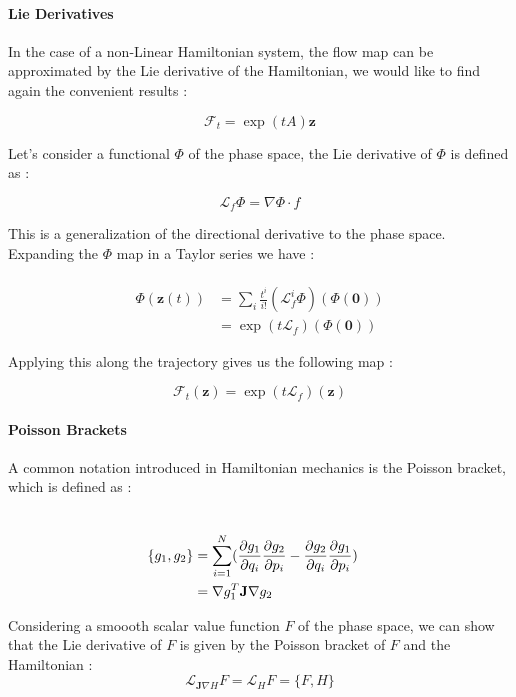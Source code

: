 \documentclass[ansiapaper]{report}
\begin{document}
\begin{multicols}{3}
	\paragraph*{Lie Derivatives}

	In the case of a non-Linear Hamiltonian system, the flow map can be approximated by the Lie derivative of the Hamiltonian, we would like to find again the convenient results :

	$$ \mathcal{F}_t = \exp(tA)\textbf{z}$$

	Let's consider a functional $\Phi$ of the phase space, the Lie derivative of $\Phi$ is defined as :

	$$ \mathcal{L}_f \Phi = \nabla \Phi \cdot f$$

	This is a generalization of the directional derivative to the phase space. Expanding the $\Phi$ map in a Taylor series we have :

	\begin{align*}
		\\ \Phi(\textbf{z}(t)) &= \sum_i \frac{t^i}{i!}(\mathcal{L}_f^i \Phi)( \Phi(\textbf{0} ))
		\\ &= \exp(t\mathcal{L}_f)(\Phi(\textbf{0}) )
	\end{align*}

	Applying this along the trajectory gives us the following map :

	$$\mathcal{F}_t(\textbf{z} ) = \exp(t\mathcal{L}_f)(\textbf{z})$$

	\paragraph*{Poisson Brackets}

	A common notation introduced in Hamiltonian mechanics is the Poisson bracket, which is defined as :

	\begin{align*}
		\\ \{g_1, g_2 \} &= \sum_{i = 1}^N (\pdv{g_1}{q_i}\pdv{g_2}{p_i} - \pdv{g_2}{q_i}\pdv{g_1}{p_i})
		\\ &= \nabla g_1^T \textbf{J} \nabla g_2
	\end{align*}

	Considering a smoooth scalar value function $F$ of the phase space, we can show that the Lie derivative of $F$ is given by the Poisson bracket of $F$ and the Hamiltonian :
\begin{equation}
    \mathcal{L}_{\textbf{J} \nabla H} F = \mathcal{L}_H F = \{F, H\}
    \label{eq:Lie_Hamiltonian}
\end{equation}


\end{multicols}
\end{document}
